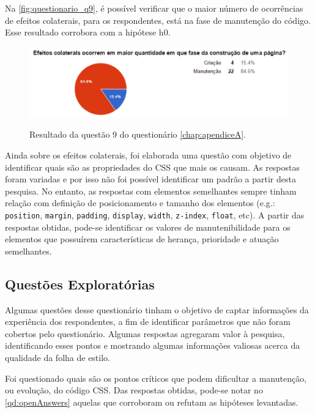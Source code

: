 Na \autoref{fig:questionario_q9}, é possível verificar que o maior número de ocorrências de efeitos colaterais, para os respondentes, está na fase de manutenção do código. Esse resultado corrobora com a hipótese h0.

\begin{figure}[!htb]
	\centering
	\caption{Resultado da questão 9 do questionário \autoref{chap:apendiceA}.}
	\includegraphics[width=1\textwidth]{./04-figuras/questionario_q9}
	\label{fig:questionario_q9}
\end{figure}

Ainda sobre os efeitos colaterais, foi elaborada uma questão com objetivo de identificar quais são as propriedades do CSS que mais os causam. As respostas foram variadas e por isso não foi possível identificar um padrão a partir desta pesquisa. No entanto, as respostas com elementos semelhantes sempre tinham relação com definição de posicionamento e tamanho dos elementos (e.g.: \texttt{position}, \texttt{margin}, \texttt{padding}, \texttt{display}, \texttt{width}, \texttt{z-index}, \texttt{float}, etc). A partir das respostas obtidas, pode-se identificar os valores de manutenibilidade para os elementos que possuírem características de herança, prioridade e atuação semelhantes.

\subsection{Questões Exploratórias}

Algumas questões desse questionário tinham o objetivo de captar informações da experiência dos respondentes, a fim de identificar parâmetros que não foram cobertos pelo questionário. Algumas respostas agregaram valor à pesquisa, identificando esses pontos e mostrando algumas informações valiosas acerca da qualidade da folha de estilo. 

Foi questionado quais são os pontos críticos que podem dificultar a manutenção, ou evolução, do código CSS. Das respostas obtidas, pode-se notar no \autoref{qd:openAnswers} aquelas que corroboram ou refutam as hipóteses levantadas.

